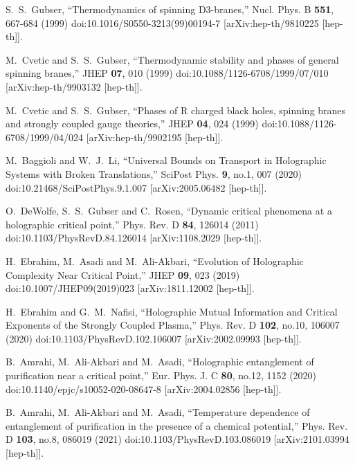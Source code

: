 \documentclass[preprintnumbers,aps,prd,longbibliography,nofootinbib,nobibnotes,amsmath,amssymb]{revtex4}
\begin{document}
\begin{thebibliography}{99}
S.~S.~Gubser,
``Thermodynamics of spinning D3-branes,''
Nucl. Phys. B \textbf{551}, 667-684 (1999)
doi:10.1016/S0550-3213(99)00194-7
[arXiv:hep-th/9810225 [hep-th]].


M.~Cvetic and S.~S.~Gubser,
``Thermodynamic stability and phases of general spinning branes,''
JHEP \textbf{07}, 010 (1999)
doi:10.1088/1126-6708/1999/07/010
[arXiv:hep-th/9903132 [hep-th]].

M.~Cvetic and S.~S.~Gubser,
``Phases of R charged black holes, spinning branes and strongly coupled gauge theories,''
JHEP \textbf{04}, 024 (1999)
doi:10.1088/1126-6708/1999/04/024
[arXiv:hep-th/9902195 [hep-th]].

M.~Baggioli and W.~J.~Li,
``Universal Bounds on Transport in Holographic Systems with Broken Translations,''
SciPost Phys. \textbf{9}, no.1, 007 (2020)
doi:10.21468/SciPostPhys.9.1.007
[arXiv:2005.06482 [hep-th]].

O.~DeWolfe, S.~S.~Gubser and C.~Rosen,
``Dynamic critical phenomena at a holographic critical point,''
Phys. Rev. D \textbf{84}, 126014 (2011)
doi:10.1103/PhysRevD.84.126014
[arXiv:1108.2029 [hep-th]].

H.~Ebrahim, M.~Asadi and M.~Ali-Akbari,
``Evolution of Holographic Complexity Near Critical Point,''
JHEP \textbf{09}, 023 (2019)
doi:10.1007/JHEP09(2019)023
[arXiv:1811.12002 [hep-th]].

H.~Ebrahim and G.~M.~Nafisi,
``Holographic Mutual Information and Critical Exponents of the Strongly Coupled Plasma,''
Phys. Rev. D \textbf{102}, no.10, 106007 (2020)
doi:10.1103/PhysRevD.102.106007
[arXiv:2002.09993 [hep-th]].

B.~Amrahi, M.~Ali-Akbari and M.~Asadi,
``Holographic entanglement of purification near a critical point,''
Eur. Phys. J. C \textbf{80}, no.12, 1152 (2020)
doi:10.1140/epjc/s10052-020-08647-8
[arXiv:2004.02856 [hep-th]].

B.~Amrahi, M.~Ali-Akbari and M.~Asadi,
``Temperature dependence of entanglement of purification in the presence of a chemical potential,''
Phys. Rev. D \textbf{103}, no.8, 086019 (2021)
doi:10.1103/PhysRevD.103.086019
[arXiv:2101.03994 [hep-th]].


\end{thebibliography}
\end{document}
